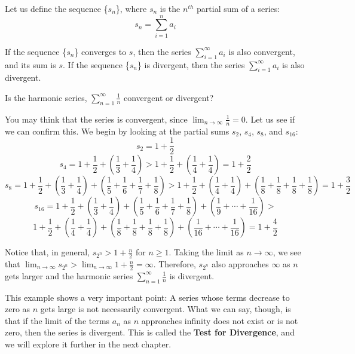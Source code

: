 Let us define the sequence \{$s_n$\}, where $s_n$ is the $n^{th}$ 
partial sum of a series:
$$s_n = \sum_{i=1}^n a_i$$

If the sequence \{$s_n$\} converges to $s$, then the series $\sum_{i=1}^\infty a_i$ is also convergent, and its sum is $s$.
If the sequence \{$s_n$\} is divergent, then the series 
$\sum_{i=1}^\infty a_i$ is also divergent.

\begin{Worked}
\begin{Problem}
Is the harmonic series, $\sum_{n = 1}^\infty \frac{1}{n}$ 
convergent or divergent?
\end{Problem}
\begin{Solution}
You may think that the series is convergent, since $\lim_
{n \to \infty} \frac{1}{n} = 0$. Let us see if we can confirm this. We begin by 
looking at the partial sums $s_2$, $s_4$, $s_8$, and $s_{16}$:
$$s_2 = 1 + \frac{1}{2}$$
$$s_4 = 1 + \frac{1}{2} + \left(\frac{1}{3} + \frac{1}{4} \right) > 1 + 
\frac{1}{2} + \left( \frac{1}{4} + \frac{1}{4} \right) = 1 + \frac{2}{2}$$
$$s_8 = 1 + \frac{1}{2} + \left(\frac{1}{3} + \frac{1}{4} \right) + \left( 
\frac{1}{5} + \frac{1}{6} + \frac{1}{7} + \frac{1}{8} \right) > 1 + \frac{1}{2} 
+ \left(\frac{1}{4} + \frac{1}{4} \right) + \left( \frac{1}{8} + \frac{1}{8} + 
\frac{1}{8} + \frac{1}{8} \right) = 1 + \frac{3}{2}$$
$$s_{16} = 1 + \frac{1}{2} + \left(\frac{1}{3} + \frac{1}{4} \right) + \left( 
\frac{1}{5} + \frac{1}{6} + \frac{1}{7} + \frac{1}{8} \right) + \left(
\frac{1}{9} + \cdots + \frac{1}{16} \right) > $$
$$1 + \frac{1}{2} + \left(\frac{1}{4} + \frac{1}{4} \right) + \left( 
\frac{1}{8} + \frac{1}{8} + \frac{1}{8} + \frac{1}{8} \right) + \left(
\frac{1}{16} + \cdots + \frac{1}{16} \right) = 1 + \frac{4}{2}$$

Notice that, in general, $s_{2^n} > 1 + \frac{n}{2}$ for $n \geq 1$. Taking the 
limit as $n \to \infty$, we see that $\lim_{n \to \infty} s_{2^n} > \lim_{n 
\to \infty} 1 + \frac{n}{2} = \infty$. Therefore, $s_{2^n}$ also approaches 
$\infty$ as $n$ gets larger and the harmonic series $\sum_{n = 1}^\infty 
\frac{1}{n}$ is divergent. 
\end{Solution}
\end{Worked}

This example shows a very important point: A series whose terms decrease to 
zero as $n$ gets large is not necessarily convergent. What we can say, though, 
is that if the limit of the terms $a_n$ as $n$ approaches infinity does not 
exist or is not zero, then the series is divergent. This 
is called the \textbf{Test for Divergence}, and we will explore it further in 
the next chapter. 

